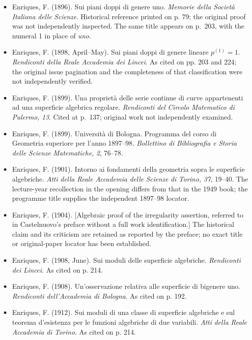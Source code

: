 \begin{sloppypar}
\begin{itemize}
\item Enriques, F. (1896). Sui piani doppi di genere uno. \emph{Memorie della Societ\`a Italiana delle Scienze}. Historical reference printed on p. 79; the original proof was not independently inspected. The same title appears on p.~203, with the numeral 1 in place of \emph{uno}.

\item Enriques, F. (1898, April--May). Sui piani doppi di genere lineare $p^{(1)}=1$. \emph{Rendiconti della Reale Accademia dei Lincei}. As cited on pp. 203 and 224; the original issue pagination and the completeness of that classification were not independently verified.

\item Enriques, F. (1899). Una proprietà delle serie continue di curve appartenenti ad una superficie algebrica regolare. \emph{Rendiconti del Circolo Matematico di Palermo, 13}. Cited at p.~137; original work not independently examined.

\item Enriques, F. (1899). Universit\`a di Bologna. Programma del corso di Geometria superiore per l'anno 1897--98. \emph{Bollettino di Bibliografia e Storia delle Scienze Matematiche, 2}, 76--78.

\item Enriques, F. (1901). Intorno ai fondamenti della geometria sopra le superficie algebriche. \emph{Atti della Reale Accademia delle Scienze di Torino, 37}, 19--40. The lecture-year recollection in the opening differs from that in the 1949 book; the programme title supplies the independent 1897--98 locator.

\item Enriques, F. (1904). [Algebraic proof of the irregularity assertion, referred to in Castelnuovo's preface without a full work identification.] The historical claim and its criticism are retained as reported by the preface; no exact title or original-paper locator has been established.

\item Enriques, F. (1908, June). Sui moduli delle superficie algebriche. \emph{Rendiconti dei Lincei}. As cited on p. 214.

\item Enriques, F. (1908). Un'osservazione relativa alle superficie di bigenere uno. \emph{Rendiconti dell'Accademia di Bologna}. As cited on p. 192.

\item Enriques, F. (1912). Sui moduli di una classe di superficie algebriche e sul teorema d'esistenza per le funzioni algebriche di due variabili. \emph{Atti della Reale Accademia di Torino}. As cited on p. 214.


\end{itemize}
\end{sloppypar}

